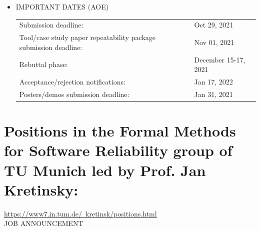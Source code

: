 \documentclass[prodmode,acmtecs]{acmsmall} %
\begin{document}
\begin{itemize}
\item  IMPORTANT DATES (AOE) 
 
\begin{tabulary}{\linewidth}{LL}Submission deadline:  & Oct 29, 2021 \\
Tool/case study paper repeatability package submission deadline:  & Nov 01, 2021 \\
Rebuttal phase:  & December 15-17, 2021 \\
Acceptance/rejection notifications:  & Jan 17, 2022 \\
Posters/demos submission deadline:  & Jan 31, 2021 \\
\end{tabulary}
 
\end{itemize}\section{Positions in the Formal Methods for Software Reliability group of TU Munich led by Prof. Jan Kretinsky: }\label{PositionsintheFormalMethodsforSoftwareReliabilitygroupofTUMunichledbyProfJanKretinsky}  \href{https://www7.in.tum.de/~kretinsk/positions.html}{https://www7.in.tum.de/~kretinsk/positions.html}\\ 
JOB ANNOUNCEMENT 
\end{document}
